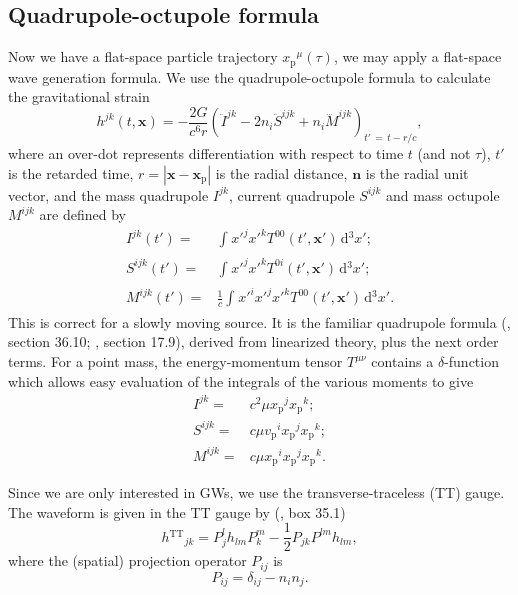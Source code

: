 \documentclass[useAMS,usedcolumn,usegraphicx,usenatbib]{mn2e}
\newcommand{\sub}[1]{\ensuremath{_\mathrm{#1}}}
\newcommand{\super}[1]{\ensuremath{^\mathrm{#1}}}
\newcommand{\dd}{\ensuremath{\mathrm{d}}}
\newcommand{\intd}[4]{\ensuremath{\int_{#1}^{#2}{#3}\,\dd{#4}}}
\newcommand{\recip}[1]{\ensuremath{\frac{1}{#1}}}
\begin{document}
\subsection{Quadrupole-octupole formula}

Now we have a flat-space particle trajectory $x\sub{p}^\mu(\tau)$, we may apply a flat-space wave generation formula. We use the quadrupole-octupole formula to calculate the gravitational strain \citep{Bekenstein1973, Press1977, Yunes2008}
\begin{equation}
h^{jk}(t, \boldsymbol{x}) = -\frac{2G}{c^6r}\left(\ddot{I}^{jk} - 2n_i\ddot{S}^{ijk} + n_i\dddot{M}^{ijk}\right)_{t'\, =\, t - r/c},
\label{eq:octupole}
\end{equation}
where an over-dot represents differentiation with respect to time $t$ (and not $\tau$), $t'$ is the retarded time, $r = \left|\boldsymbol{x} - \boldsymbol{x}\sub{p}\right|$ is the radial distance, $\boldsymbol{n}$ is the radial unit vector, and the mass quadrupole ${I}^{jk}$, current quadrupole ${S}^{ijk}$ and mass octupole ${M}^{ijk}$ are defined by
\begin{align}
{I}^{jk}\left(t'\right) = {} & \intd{}{}{{x'}^j{x'}^kT^{00}\left(t', \boldsymbol{x'}\right) }{^3x'};\\
{S}^{ijk}\left(t'\right) = {} & \intd{}{}{{x'}^j{x'}^kT^{0i}\left(t', \boldsymbol{x'}\right)}{^3x'};\\
{M}^{ijk}\left(t'\right)  = {} & \recip{c}\intd{}{}{{x'}^i{x'}^j{x'}^kT^{00}\left(t', \boldsymbol{x'}\right)}{^3x'}.
\end{align}
This is correct for a slowly moving source. It is the familiar quadrupole formula (\citealt*{Misner1973}, section 36.10; \citealt{Hobson2006}, section 17.9), derived from linearized theory, plus the next order terms. For a point mass, the energy-momentum tensor $T^{\mu\nu}$ contains a $\delta$-function which allows easy evaluation of the integrals of the various moments to give
\begin{align}
{I}^{jk} = {} & c^2\mu x\sub{p}^jx\sub{p}^k;\\
{S}^{ijk} = {} & c\mu v\sub{p}^ix\sub{p}^jx\sub{p}^k;\\
{M}^{ijk} = {} & c\mu x\sub{p}^ix\sub{p}^jx\sub{p}^k.
\end{align}

Since we are only interested in GWs, we use the transverse-traceless (TT) gauge. The waveform is given in the TT gauge by (\citealt{Misner1973}, box 35.1)
\begin{equation}
h\super{TT}_{jk} = P^l_jh_{lm}P^m_k - \recip{2}P_{jk}P^{lm}h_{lm},
\end{equation}
where the (spatial) projection operator $P_{ij}$ is
\begin{equation}
P_{ij} = \delta_{ij} - n_in_j.
\end{equation}
\end{document}
